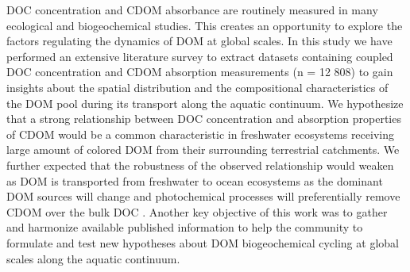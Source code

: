 DOC concentration and CDOM absorbance are routinely measured in many ecological and biogeochemical studies. This creates an opportunity to explore the factors regulating the dynamics of DOM at global scales. In this study we have performed an extensive literature survey to extract datasets containing coupled DOC concentration and CDOM absorption measurements (n = 12 808) to gain insights about the spatial distribution and the compositional characteristics of the DOM pool during its transport along the aquatic continuum. We hypothesize that a strong relationship between DOC concentration and absorption properties of CDOM would be a common characteristic in freshwater ecosystems receiving large amount of colored DOM from their surrounding terrestrial catchments. We further expected that the robustness of the observed relationship would weaken as DOM is transported from freshwater to ocean ecosystems as the dominant DOM sources will change and photochemical processes will preferentially remove CDOM over the bulk DOC \citep{Vahatalo2004}. Another key objective of this work was to gather and harmonize available published information to help the community to formulate and test new hypotheses about DOM biogeochemical cycling at global scales along the aquatic continuum.
